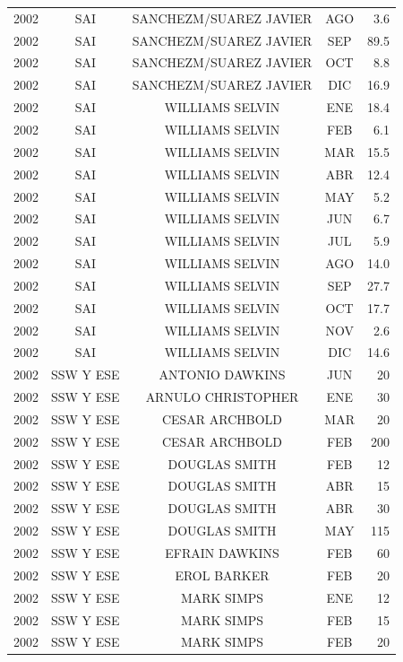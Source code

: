 \documentclass[12pt,]{article}
\begin{document}
\begin{table}[ht]
{\begin{tabular}{lcccr}
  2002 & SAI & SANCHEZM/SUAREZ JAVIER & AGO & 3.6 \\ 
  2002 & SAI & SANCHEZM/SUAREZ JAVIER & SEP & 89.5 \\ 
  2002 & SAI & SANCHEZM/SUAREZ JAVIER & OCT & 8.8 \\ 
  2002 & SAI & SANCHEZM/SUAREZ JAVIER & DIC & 16.9 \\ 
  2002 & SAI & WILLIAMS SELVIN & ENE & 18.4 \\ 
  2002 & SAI & WILLIAMS SELVIN & FEB & 6.1 \\ 
  2002 & SAI & WILLIAMS SELVIN & MAR & 15.5 \\ 
  2002 & SAI & WILLIAMS SELVIN & ABR & 12.4 \\ 
  2002 & SAI & WILLIAMS SELVIN & MAY & 5.2 \\ 
  2002 & SAI & WILLIAMS SELVIN & JUN & 6.7 \\ 
  2002 & SAI & WILLIAMS SELVIN & JUL & 5.9 \\ 
  2002 & SAI & WILLIAMS SELVIN & AGO & 14.0 \\ 
  2002 & SAI & WILLIAMS SELVIN & SEP & 27.7 \\ 
  2002 & SAI & WILLIAMS SELVIN & OCT & 17.7 \\ 
  2002 & SAI & WILLIAMS SELVIN & NOV & 2.6 \\ 
  2002 & SAI & WILLIAMS SELVIN & DIC & 14.6 \\ 
  2002 & SSW Y ESE & ANTONIO DAWKINS & JUN & 20 \\ 
  2002 & SSW Y ESE & ARNULO CHRISTOPHER & ENE & 30 \\ 
  2002 & SSW Y ESE & CESAR ARCHBOLD & MAR & 20 \\ 
  2002 & SSW Y ESE & CESAR ARCHBOLD & FEB & 200 \\ 
  2002 & SSW Y ESE & DOUGLAS SMITH & FEB & 12 \\ 
  2002 & SSW Y ESE & DOUGLAS SMITH & ABR & 15 \\ 
  2002 & SSW Y ESE & DOUGLAS SMITH & ABR & 30 \\ 
  2002 & SSW Y ESE & DOUGLAS SMITH & MAY & 115 \\ 
  2002 & SSW Y ESE & EFRAIN DAWKINS & FEB & 60 \\ 
  2002 & SSW Y ESE & EROL BARKER & FEB & 20 \\ 
  2002 & SSW Y ESE & MARK SIMPS & ENE & 12 \\ 
  2002 & SSW Y ESE & MARK SIMPS & FEB & 15 \\ 
  2002 & SSW Y ESE & MARK SIMPS & FEB & 20 \\ 

\end{tabular}}
\end{table}
\end{document}
